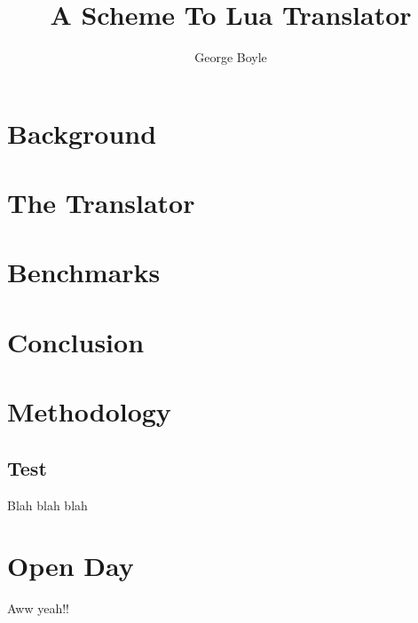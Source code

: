 \documentclass{report}
\begin{document}
\title{A Scheme To Lua Translator}
\author{George Boyle}
\maketitle

\tableofcontents

\chapter{Background}




\chapter{The Translator}

\chapter{Benchmarks}

\chapter{Conclusion}


\appendix

\chapter{Methodology}
\section{Test}
Blah blah blah

\chapter{Open Day}
Aww yeah!!
\end{document}
